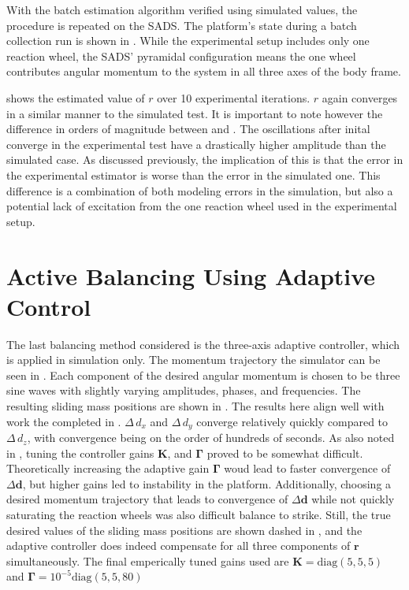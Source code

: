 With the batch estimation algorithm verified using simulated values, the procedure is repeated on the SADS. The platform's state during a batch collection run is shown in . While the experimental setup includes only one reaction wheel, the SADS' pyramidal configuration means the one wheel contributes angular momentum to the system in all three axes of the body frame. 


 shows the estimated value of $r$ over 10 experimental iterations. $r$ again converges in a similar manner to the simulated test. It is important to note however the difference in orders of magnitude between  and . The oscillations after inital converge in the experimental test have a drastically higher amplitude than the simulated case. As discussed previously, the implication of this is that the error in the experimental estimator is worse than the error in the simulated one. This difference is a combination of both modeling errors in the simulation, but also a potential lack of excitation from the one reaction wheel used in the experimental setup. 



\section{Active Balancing Using Adaptive Control}

The last balancing method considered is the three-axis adaptive controller, which is applied in simulation only. The momentum trajectory the simulator can be seen in . Each component of the desired angular momentum is chosen to be three sine waves with slightly varying amplitudes, phases, and frequencies. The resulting sliding mass positions are shown in . The results here align well with work the completed in \cite{kim_automatic_2009}. $\Delta\,d_x$ and $\Delta\,d_y$ converge relatively quickly compared to $\Delta\bm\,d_z$, with convergence being on the order of hundreds of seconds. As also noted in \cite{kim_automatic_2009}, tuning the controller gains $\bm{K}$, and $\bm{\Gamma}$ proved to be somewhat difficult. Theoretically increasing the adaptive gain $\bm{\Gamma}$ woud lead to faster convergence of $\Delta\bm{d}$, but higher gains led to instability in the platform. Additionally, choosing a desired momentum trajectory that leads to convergence of $\Delta\bm{d}$ while not quickly saturating the reaction wheels was also difficult balance to strike. Still, the true desired values of the sliding mass positions are shown dashed in , and the adaptive controller does indeed compensate for all three components of $\bm{r}$ simultaneously. The final emperically tuned gains used are 
$\bm{K} = \text{diag}(5,5,5)$ and  $\bm{\Gamma} = 10^{-5}\text{diag}(5, 5 , 80)$

